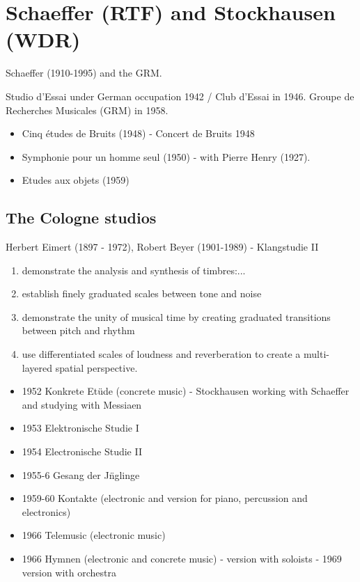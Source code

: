 \section{Schaeffer (RTF) and Stockhausen (WDR)}

Schaeffer (1910-1995) and the GRM.

Studio d'Essai under German occupation 1942 / Club d'Essai in 1946. Groupe de Recherches Musicales (GRM) in 1958.

\begin{itemize}
\item Cinq \'etudes de Bruits (1948) - Concert de Bruits 1948
\item Symphonie pour un homme seul (1950) - with Pierre Henry (1927).
\item Etudes aux objets (1959)
\end{itemize}

\subsection{The Cologne studios}

Herbert Eimert (1897 - 1972), Robert Beyer (1901-1989) - Klangstudie II

\begin{enumerate}
\item demonstrate the analysis and synthesis of timbres:...
\item establish finely graduated scales between tone and noise
\item demonstrate the unity of musical time by creating graduated transitions between pitch and rhythm
\item use differentiated scales of loudness and reverberation to create a multi-layered spatial perspective.
\end{enumerate}

\begin{itemize}
\item 1952 Konkrete Et\"ude (concrete music) - Stockhausen working with Schaeffer and studying with Messiaen
\item 1953 Elektronische Studie I
\item 1954 Electronische Studie II
\item 1955-6 Gesang der J\"nglinge
\item 1959-60 Kontakte (electronic and version for piano, percussion and electronics)
\item 1966 Telemusic (electronic music)
\item 1966 Hymnen (electronic and concrete music) - version with soloists - 1969 version with orchestra
\end{itemize}

